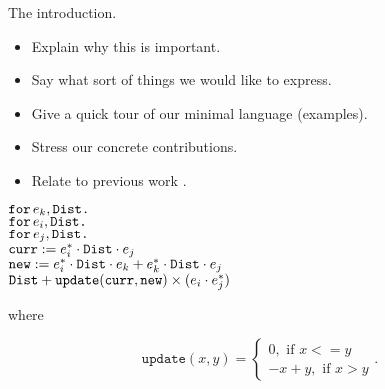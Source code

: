 The introduction.

\begin{itemize}
\item Explain why this is important.
\item Say what sort of things we would like to express.
\item Give a quick tour of our minimal language (examples).
\item Stress our concrete contributions.
\item Relate to previous work \cite{matlang,BrijderGBW19,Geerts19,HutchisonHS17}.
\end{itemize}


\noindent
$\texttt{for}\, e_k,\texttt{Dist} \texttt{.}\, $
\\
\hspace*{0.5cm} $\texttt{for}\, e_i,\texttt{Dist} \texttt{.}\, $
\\
\hspace*{1cm} $\texttt{for}\, e_j,\texttt{Dist} \texttt{.}\, $
\\
\hspace*{1.5cm} 
$\texttt{curr} := e_i^*\cdot \texttt{Dist} \cdot e_j$\\
\hspace*{1.5cm} 
$\texttt{new} := e_i^*\cdot \texttt{Dist} \cdot e_k + e_k^*\cdot \texttt{Dist}\cdot e_j$\\
\hspace*{1.5cm}
$\texttt{Dist} + \texttt{update}(\texttt{curr},\texttt{new})\times (e_i\cdot e_j^*)$

where

\[
  			\texttt{update}(x,y)=\begin{cases}
               0, \text{ if } x<=y \\
               -x + y, \text{ if } x > y
            \end{cases}.
		\]